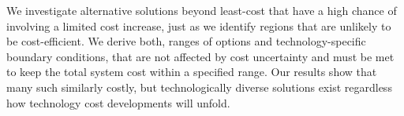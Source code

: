 

We investigate alternative solutions beyond least-cost
that have a high chance of involving a limited cost increase,
just as we identify regions that are unlikely to be cost-efficient.
We derive both, ranges of options and technology-specific boundary conditions,
that are not affected by cost uncertainty and must be 
met to keep the total system cost within a specified range.
Our results show that many such similarly costly,
but technologically diverse solutions exist regardless
how technology cost developments will unfold.

